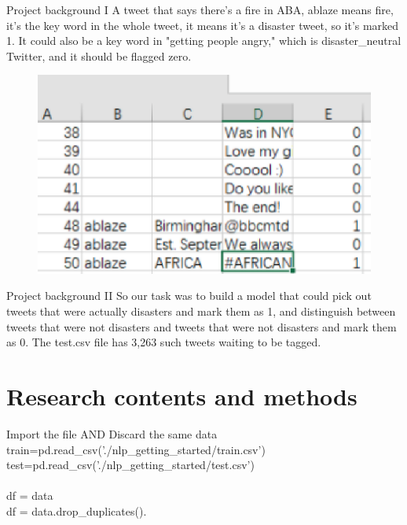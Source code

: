 \documentclass[
 size=14pt,
 paper=smartboard,  %
 mode=present, 		%
 display=slides, 	%
 style=tuliplab,  	%
 pauseslide,
 fleqn,leqno]{powerdot}
\begin{document}
\begin{slide}{Project background I}
A tweet that says there's a fire in ABA, ablaze means fire, it's the key word in the whole tweet, it means it's a disaster tweet, so it's marked 1. It could also be a key word in "getting people angry," which is disaster\_neutral Twitter, and it should be flagged zero. \\
\begin{center}
	\begin{figure}[htbp]
		\includegraphics[scale=0.8]{./pic/2.eps}
	\end{figure}
\end{center}
\end{slide}
\begin{slide}{Project background II}
	So our task was to build a model that could pick out tweets that were actually disasters and mark them as 1, and distinguish between tweets that were not disasters and tweets that were not disasters and mark them as 0. The test.csv file has 3,263 such tweets waiting to be tagged.
\end{slide}

\section{Research contents and methods}

\begin{slide}{Import the file AND Discard the same data}
train=pd.read\_csv('./nlp\_getting\_started/train.csv')\\
test=pd.read\_csv('./nlp\_getting\_started/test.csv')\\
\\
df = data\\
df = data.drop\_duplicates().\\
\end{slide}
\end{document}
